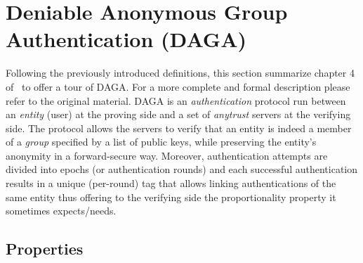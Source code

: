 
    \section{Deniable Anonymous Group Authentication (DAGA)}
    \label{sec:daga}

    Following the previously introduced definitions, this section summarize chapter 4 of~\cite{syta_identity_2015} to offer
    a tour of DAGA. For a more complete and formal description please refer to the original material.
    \newline
    DAGA is an \emph{authentication} protocol run between an \emph{entity} (user)
    at the proving side and a set of \emph{anytrust} servers at the verifying side.
    The protocol allows the servers to verify that an entity is indeed a member of a \emph{group} specified by a list
    of public keys, while preserving the entity's anonymity in a forward-secure way.
    Moreover, authentication attempts are divided into epochs (or authentication rounds) and each successful authentication
    results in a unique (per-round) tag that allows linking authentications of the same entity thus offering to the verifying side
    the proportionality property it sometimes expects/needs.
    \subsection[Properties]{Properties} %
    \label{subsec:properties}

